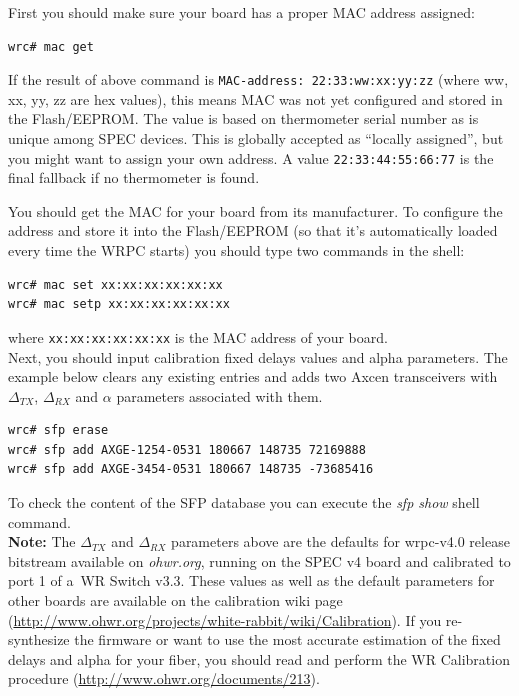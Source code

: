 \documentclass[a4paper, 12pt]{article}
\renewcommand{\_}{\underscore\allowbreak}
\begin{document}
\noindent First you should make sure your board has a proper MAC address
assigned:
\begin{lstlisting}
wrc# mac get
\end{lstlisting}
If the result of above command is \texttt{MAC-address: 22:33:ww:xx:yy:zz} (where
ww, xx, yy, zz are hex values), this
means MAC was not yet configured and stored in the Flash/EEPROM. The value is
based on thermometer serial number as is unique among SPEC devices. This is
globally accepted as ``locally assigned'', but you might want to assign your own
address. A value \texttt{22:33:44:55:66:77} is the final fallback if no
thermometer is found.

You should get the MAC for your board from its manufacturer. To configure the
address and store it into the Flash/EEPROM (so that it's automatically loaded
every time the WRPC starts) you should type two commands in the shell:
\begin{lstlisting}
wrc# mac set xx:xx:xx:xx:xx:xx
wrc# mac setp xx:xx:xx:xx:xx:xx
\end{lstlisting}
where \texttt{xx:xx:xx:xx:xx:xx} is the MAC address of your board.\\

Next, you should input calibration fixed delays values and alpha parameters. The
example below clears any existing entries and adds two Axcen transceivers with
$\Delta_{TX}$, $\Delta_{RX}$ and $\alpha$ parameters associated with them.

\begin{lstlisting}
wrc# sfp erase
wrc# sfp add AXGE-1254-0531 180667 148735 72169888
wrc# sfp add AXGE-3454-0531 180667 148735 -73685416
\end{lstlisting}

To check the content of the SFP database you can execute the \textit{sfp show}
shell command.\\

\noindent\textbf{Note:} The $\Delta_{TX}$ and $\Delta_{RX}$ parameters above are
the defaults for wrpc-v4.0 release bitstream available on \textit{ohwr.org},
running on the SPEC v4 board and calibrated to port 1 of a~WR Switch
v3.3. These values as well as the default parameters for other boards are
available on the calibration wiki page
(\url{http://www.ohwr.org/projects/white-rabbit/wiki/Calibration}). If you
re-synthesize the firmware or want to use the most accurate estimation of
the fixed delays and alpha for your fiber, you should read and perform the WR
Calibration procedure (\url{http://www.ohwr.org/documents/213}).\\
\end{document}
